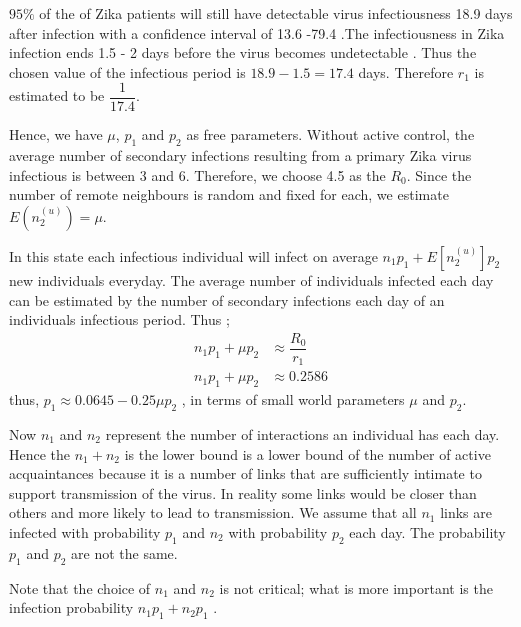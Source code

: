   $95\%$ of the of Zika patients will still have detectable virus infectiousness 18.9 days after infection with a confidence interval of 13.6 -79.4 \citep{lessler2016times}.The infectiousness in Zika infection ends 1.5 - 2 days before the virus becomes undetectable \citep{funk2016comparative}. Thus the chosen value of the infectious period is $18.9 - 1.5 = 17.4$ days. Therefore $r_1$ is estimated to be $\dfrac{1}{17.4}$.

  Hence, we have $\mu$, $p_1$ and $p_2$  as free parameters. Without active control, the average number of secondary infections resulting from a primary  Zika  virus infectious is between 3 and 6. Therefore, we choose 4.5 as the $R_0$. Since the number of remote neighbours is random and fixed for each, we estimate $E (n^ {(u)} _2) = \mu$.

In this state each infectious individual will infect on average $n_1p_1 + E[n^{(u)}_2]p_2 $ new individuals everyday. The average number  of individuals infected each day can be estimated by the number of secondary infections each day of an individuals infectious period. Thus ;
\begin{align}
n_1 p_1 + \mu p_2 &\approx \dfrac{R_0}{r_1} 
\\ n_1 p_1 + \mu p_2 &\approx 0.2586 \label{eqn 5.32}
\end{align}
thus, 
$p_1 \approx   0.0645- 0.25 \mu p_2$ , in terms of small world parameters $\mu$ and $p_2$.

Now $n_1$ and $n_2$ represent the number of interactions an individual has each day. Hence the  $n_1 + n_2$ is the lower bound is a lower bound of the number of active acquaintances because it is a number of links that are sufficiently intimate to support transmission of the virus. In reality some links would be closer than others and more likely to lead to transmission. We assume that all $n_1$ links are infected with probability $p_1$ and $n_2$ with probability $p_2$ each day. The probability $p_1$ and $p_2$ are not the same.

Note that the choice of $n_1$ and $n_2$ is not critical; what is more important is the infection probability $n_1p_1 + n_2p_1$ .


